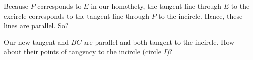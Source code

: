 







Because $P$ corresponds to $E$ in our homothety, the tangent line through $E$ to the excircle corresponds to the tangent line through $P$ to the incircle. Hence, these lines are parallel. So?


Our new tangent and $BC$ are parallel and both tangent to the incircle. How about their points of tangency to the incircle (circle $I$)?








